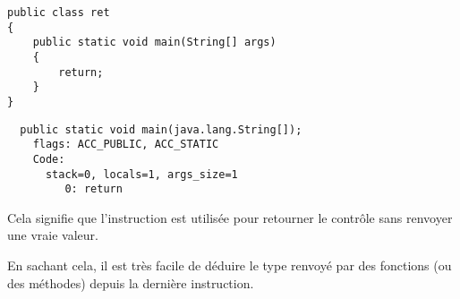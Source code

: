 \begin{lstlisting}[style=customjava]
public class ret
{
	public static void main(String[] args)
	{
		return;
	}
}
\end{lstlisting}

\begin{lstlisting}
  public static void main(java.lang.String[]);
    flags: ACC_PUBLIC, ACC_STATIC
    Code:
      stack=0, locals=1, args_size=1
         0: return
\end{lstlisting}

Cela signifie que l'instruction  est utilisée pour retourner le contrôle sans renvoyer
une vraie valeur.

En sachant cela, il est très facile de déduire le type renvoyé par des fonctions (ou des méthodes) depuis la dernière instruction.

